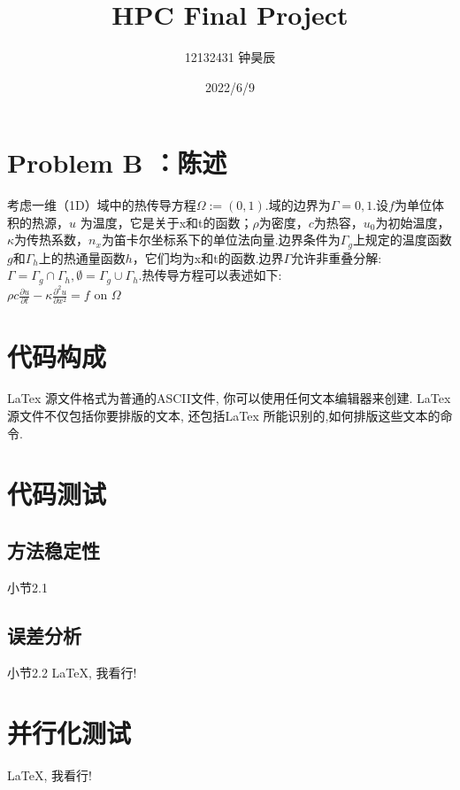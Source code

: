 \documentclass{article}
\title{HPC Final Project}
\author{12132431 钟昊辰}
\date{2022/6/9}
\begin{document}
		\maketitle     %
		
		\tableofcontents   %
		
		\clearpage
		
		\section{Problem B ：陈述}
		考虑一维（1D）域中的热传导方程$\Omega:=(0,1)$.域的边界为$\Gamma={0,1}$.设$f$为单位体积的热源，$u$ 为温度，它是关于x和t的函数；$\rho$为密度，$c$为热容，$u_0$为初始温度，$\kappa$为传热系数，$n_x$为笛卡尔坐标系下的单位法向量.边界条件为$\Gamma_g$上规定的温度函数$g$和$\Gamma_h$上的热通量函数$h$，它们均为x和t的函数.边界$\Gamma$允许非重叠分解:$ \Gamma = \Gamma_g \cap \Gamma_h,\emptyset = \Gamma_g \cup \Gamma_h$.热传导方程可以表述如下:
		\\
		$
		\rho c \frac{\partial u}{\partial t}-\kappa\frac{\partial^2 u}{\partial x^2}=f
		$ \quad on $\Omega $
		
		
		
		\clearpage
		
		\section{代码构成}
		
		LaTex 源文件格式为普通的ASCII文件,
		你可以使用任何文本编辑器来创建.
		LaTex源文件不仅包括你要排版的文本, 还包括LaTex
		所能识别的,如何排版这些文本的命令.
		
		\clearpage
		
		\section{代码测试}
		\subsection{方法稳定性}
		小节2.1
		\subsection{误差分析}
		小节2.2
		LaTeX, 我看行!
		
		\clearpage
		
		\section{并行化测试}
		
		LaTeX, 我看行!
		
\end{document}
